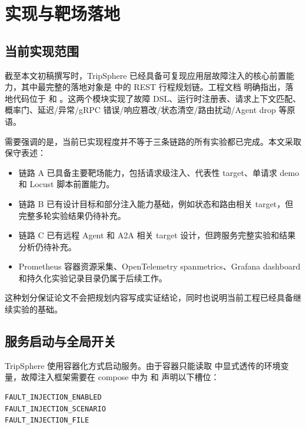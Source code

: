 \chapter{实现与靶场落地}

\section{当前实现范围}

截至本文初稿撰写时，TripSphere 已经具备可复现应用层故障注入的核心前置能力，其中最完整的落地对象是  中的 REST 行程规划链。工程文档  明确指出，落地代码位于  和 。这两个模块实现了故障 DSL、运行时注册表、请求上下文匹配、概率门、延迟/异常/gRPC 错误/响应篡改/状态清空/路由扰动/Agent drop 等原语。

需要强调的是，当前已实现程度并不等于三条链路的所有实验都已完成。本文采取保守表述：

\begin{itemize}
  \item 链路 A 已具备主要靶场能力，包括请求级注入、代表性 target、单请求 demo 和 Locust 脚本前置能力。
  \item 链路 B 已有设计目标和部分注入能力基础，例如状态和路由相关 target，但完整多轮实验结果仍待补充。
  \item 链路 C 已有远程 Agent 和 A2A 相关 target 设计，但跨服务完整实验和结果分析仍待补充。
  \item Prometheus 容器资源采集、OpenTelemetry spanmetrics、Grafana dashboard 和持久化实验记录目录仍属于后续工作。
\end{itemize}

这种划分保证论文不会把规划内容写成实证结论，同时也说明当前工程已经具备继续实验的基础。

\section{服务启动与全局开关}

TripSphere 使用容器化方式启动服务。由于容器只能读取  中显式透传的环境变量，故障注入框架需要在 compose 中为  和  声明以下槽位：

\begin{verbatim}
FAULT_INJECTION_ENABLED
FAULT_INJECTION_SCENARIO
FAULT_INJECTION_FILE
\end{verbatim}

